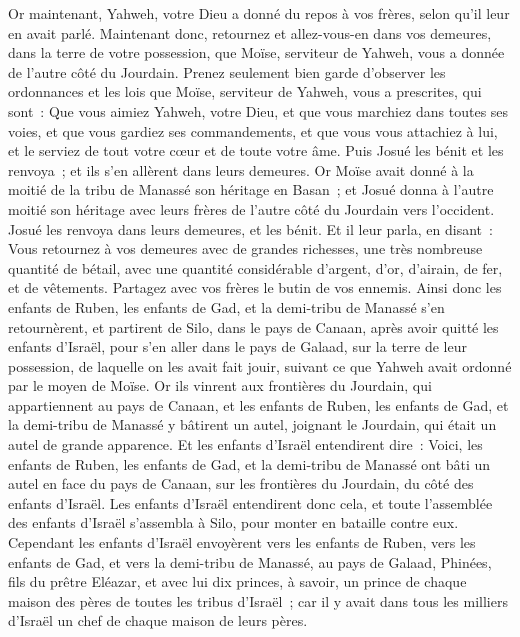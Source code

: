 \begin{multicols}{2}
Or maintenant, Yahweh, votre Dieu a donné du repos à vos frères, selon qu'il leur en avait parlé. Maintenant donc, retournez et allez-vous-en dans vos demeures, dans la terre de votre possession, que Moïse, serviteur de Yahweh, vous a donnée de l'autre côté du Jourdain.
Prenez seulement bien garde d'observer les ordonnances et les lois que Moïse, serviteur de Yahweh, vous a prescrites, qui sont~: Que vous aimiez Yahweh, votre Dieu, et que vous marchiez dans toutes ses voies, et que vous gardiez ses commandements, et que vous vous attachiez à lui, et le serviez de tout votre cœur et de toute votre âme.
Puis Josué les bénit et les renvoya~; et ils s'en allèrent dans leurs demeures.
Or Moïse avait donné à la moitié de la tribu de Manassé son héritage en Basan~; et Josué donna à l'autre moitié son héritage avec leurs frères de l'autre côté du Jourdain vers l'occident. Josué les renvoya dans leurs demeures, et les bénit.
Et il leur parla, en disant~: Vous retournez à vos demeures avec de grandes richesses, une très nombreuse quantité de bétail, avec une quantité considérable d'argent, d'or, d'airain, de fer, et de vêtements. Partagez avec vos frères le butin de vos ennemis.
Ainsi donc les enfants de Ruben, les enfants de Gad, et la demi-tribu de Manassé s'en retournèrent, et partirent de Silo, dans le pays de Canaan, après avoir quitté les enfants d'Israël, pour s'en aller dans le pays de Galaad, sur la terre de leur possession, de laquelle on les avait fait jouir, suivant ce que Yahweh avait ordonné par le moyen de Moïse.
Or ils vinrent aux frontières du Jourdain, qui appartiennent au pays de Canaan, et les enfants de Ruben, les enfants de Gad, et la demi-tribu de Manassé y bâtirent un autel, joignant le Jourdain, qui était un autel de grande apparence.
Et les enfants d'Israël entendirent dire~: Voici, les enfants de Ruben, les enfants de Gad, et la demi-tribu de Manassé ont bâti un autel en face du pays de Canaan, sur les frontières du Jourdain, du côté des enfants d'Israël.
Les enfants d'Israël entendirent donc cela, et toute l'assemblée des enfants d'Israël s'assembla à Silo, pour monter en bataille contre eux.
Cependant les enfants d'Israël envoyèrent vers les enfants de Ruben, vers les enfants de Gad, et vers la demi-tribu de Manassé, au pays de Galaad, Phinées, fils du prêtre Eléazar,
et avec lui dix princes, à savoir, un prince de chaque maison des pères de toutes les tribus d'Israël~; car il y avait dans tous les milliers d'Israël un chef de chaque maison de leurs pères. 

\end{multicols}
